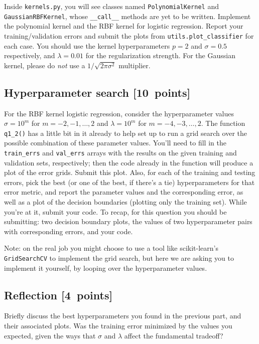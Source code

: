 \documentclass{article}
\newcommand{\blu}[1]{{\textcolor{blu}{#1}}}
\let\ask\blu
\newenvironment{asking}{\begingroup\color{blu}}{\endgroup}
\newcommand\pts[1]{\textcolor{pointscolour}{[#1~points]}}
\begin{document}
Inside \texttt{kernels.py}, you will see classes named \texttt{PolynomialKernel} and \texttt{GaussianRBFKernel}, whose \verb|__call__| methods are yet to be written.
\begin{asking}
  Implement the polynomial kernel and the RBF kernel for logistic regression.
  Report your training/validation errors and submit the plots from \verb|utils.plot_classifier| for each case.
\end{asking}
You should use the kernel hyperparameters $p=2$ and $\sigma=0.5$ respectively,
and $\lambda=0.01$ for the regularization strength.
For the Gaussian kernel, please do \emph{not} use a $1/\sqrt{2\pi\sigma^2}$ multiplier.




\subsection{Hyperparameter search \pts{10}}

For the RBF kernel logistic regression, consider the hyperparameter values $\sigma=10^m$ for $m=-2,-1,\ldots,2$ and $\lambda=10^m$ for $m=-4,-3,\ldots,2$.
The function \verb|q1_2()| has a little bit in it already to help set up to run a grid search over the possible combination of these parameter values.
You'll need to fill in the \verb|train_errs| and \verb|val_errs| arrays
with the results on the given training and validation sets, respectively;
then the code already in the function will produce a plot of the error grids.
\ask{Submit this plot}.
Also, for each of the training and testing errors,
pick the best (or one of the best, if there's a tie) hyperparameters for that error metric,
and \ask{report the parameter values and the corresponding error, as well as a plot of the decision boundaries (plotting only the training set)}.
While you're at it, \ask{submit your code}.
To recap, for this question you should be submitting:
two decision boundary plots,
the values of two hyperparameter pairs with corresponding errors,
and your code.

Note: on the real job you might choose to use a tool like scikit-learn's \texttt{GridSearchCV} to implement the grid search, but here we are asking you to implement it yourself, by looping over the hyperparameter values.


\subsection{Reflection \pts{4}}
\ask{
Briefly discuss the best hyperparameters you found in the previous part, and their associated plots. Was the training error minimized by the values you expected, given the ways that $\sigma$ and $\lambda$ affect the fundamental tradeoff?
}
\end{document}
